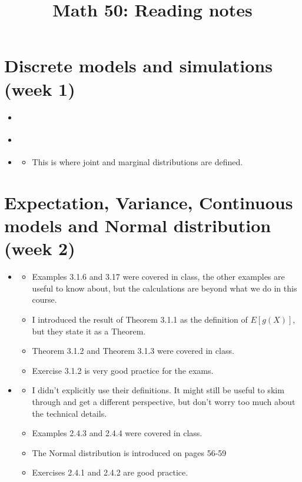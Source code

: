 




\title{Math 50: Reading notes}

\maketitle

\section*{Discrete models and simulations (week 1)}
\begin{itemize}
\item  \cite[Section 2.4]{islp}
\item \cite[Section 2.8]{tabak}
\item \cite[Section 2.7]{tabak}
\begin{itemize}
\item  This is where joint and marginal distributions are defined. 
\end{itemize}
\end{itemize}
\section*{Expectation, Variance, Continuous models and Normal distribution (week 2)}
\begin{itemize}
\item  \cite[Chapter 3]{tabak} 
\begin{itemize}
\item Examples 3.1.6 and 3.17 were covered in class, the other examples are useful to know about, but the calculations are beyond what we do in this course. 
\item I introduced the result of Theorem 3.1.1 as the definition of $E[g(X)]$, but they state it as a Theorem. 
\item Theorem 3.1.2 and Theorem 3.1.3 were covered in class. 
\item Exercise 3.1.2 is very good practice for the exams. 
\end{itemize}
\item  \cite[Section 2.4]{tabak} 
\begin{itemize}
\item I didn't explicitly use their definitions. It might still be useful to skim through and get a different perspective, but don't worry too much about the technical details.
\item Examples 2.4.3 and 2.4.4 were covered in class. 
\item The Normal distribution is introduced on pages 56-59
\item Exercises 2.4.1 and 2.4.2 are good practice.
\end{itemize}
\end{itemize}
